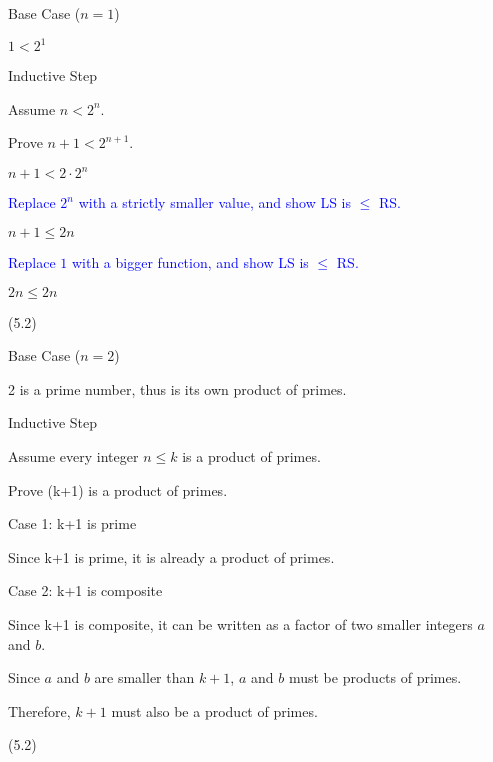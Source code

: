 \documentclass{exam}
\begin{document}
\begin{questions}
\begin{center}
Base Case (\(n = 1\))

\( 1 < 2^1 \)

\vspace{5px}

Inductive Step

Assume \( n < 2^n \). 

Prove \( n+1 < 2^{n+1} \).

\( n+1 < 2 \cdot 2^n \) 

\textcolor{blue}{Replace \(2^n\) with a strictly smaller value, and show LS is \(\leq\) RS.}

\( n+1 \leq 2n \) 

\textcolor{blue}{Replace \(1\) with a bigger function, and show LS is \(\leq\) RS.}

\( 2n \leq 2n \)

\end{center}

 (5.2)

\begin{center}
Base Case (\(n = 2\))

2 is a prime number, thus is its own product of primes.

\vspace{5px}

Inductive Step

Assume every integer \( n \leq k \) is a product of primes. 

Prove (k+1) is a product of primes.

Case 1: k+1 is prime

Since k+1 is prime, it is already a product of primes.
\vspace{5px}

Case 2: k+1 is composite

Since k+1 is composite, it can be written as a factor of two smaller integers \(a\) and \(b\).

Since \(a\) and \(b\) are smaller than \(k+1\), \(a\) and \(b\) must be products of primes.

Therefore, \(k+1\) must also be a product of primes.

\end{center}

\newpage

 (5.2)


\end{questions}
\end{document}
